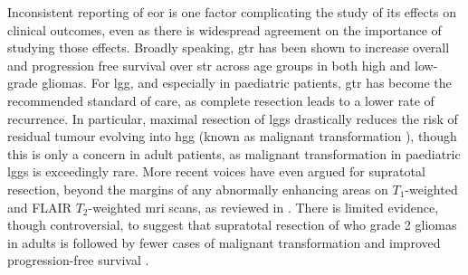 Inconsistent reporting of \gls{eor} is one factor complicating the study of its effects on clinical outcomes, even as there is widespread agreement on the importance of studying those effects\autocite{Rincon-Torroella2019,Wykes2021,Weller2021}.
Broadly speaking, \gls{gtr} has been shown to increase overall and progression free survival over \gls{str} across age groups in both high \autocite{Hatoum2022, Han2020, Adams2016, McCrea2015, Bloch2012, McGirt2009, Kramm2006} and low-grade \autocite{Keles2001, Pollack1995, Sanai2008} gliomas.
For \gls{lgg}, and especially in paediatric patients, \gls{gtr} has become the recommended standard of care, as complete resection leads to a lower rate of recurrence\autocite{Berger1994,Claus2005}.
In particular, maximal resection of \glspl{lgg} drastically reduces the risk of residual tumour evolving into \gls{hgg} (known as malignant transformation \autocite{Duffau2013,Hervey-Jumper2016,Rincon-Torroella2019}), though this is only a concern in adult patients, as malignant transformation in paediatric \glspl{lgg} is exceedingly rare\autocite{Collins2020}.
More recent voices have even argued for supratotal resection, beyond the margins of any abnormally enhancing areas on $T_1$-weighted and FLAIR $T_2$-weighted \gls{mri} scans, as reviewed in \textcite{deLeeuw2019}.
There is limited evidence, though controversial, to suggest that supratotal resection of \gls{who} grade 2 gliomas in adults is followed by fewer cases of malignant transformation and improved progression-free survival \autocite{Yordanova2011}.

